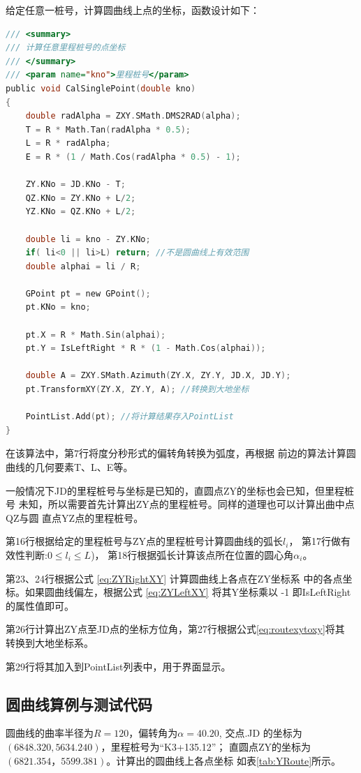 给定任意一桩号，计算圆曲线上点的坐标，函数设计如下：
\begin{lstlisting}[language=C]
/// <summary>
/// 计算任意里程桩号的点坐标
/// </summary>
/// <param name="kno">里程桩号</param>
public void CalSinglePoint(double kno)
{
    double radAlpha = ZXY.SMath.DMS2RAD(alpha);
    T = R * Math.Tan(radAlpha * 0.5);
    L = R * radAlpha;
    E = R * (1 / Math.Cos(radAlpha * 0.5) - 1);

    ZY.KNo = JD.KNo - T;
    QZ.KNo = ZY.KNo + L/2;
    YZ.KNo = QZ.KNo + L/2;

    double li = kno - ZY.KNo;
    if( li<0 || li>L) return; //不是圆曲线上有效范围
    double alphai = li / R;

    GPoint pt = new GPoint();
    pt.KNo = kno;

    pt.X = R * Math.Sin(alphai);
    pt.Y = IsLeftRight * R * (1 - Math.Cos(alphai));

    double A = ZXY.SMath.Azimuth(ZY.X, ZY.Y, JD.X, JD.Y);
    pt.TransformXY(ZY.X, ZY.Y, A); //转换到大地坐标

    PointList.Add(pt); //将计算结果存入PointList
}
\end{lstlisting}

在该算法中，第7行将度分秒形式的偏转角转换为弧度，再根据
前边的算法计算圆曲线的几何要素T、L、E等。

一般情况下JD的里程桩号与坐标是已知的，直圆点ZY的坐标也会已知，但里程桩号
未知，所以需要首先计算出ZY点的里程桩号。同样的道理也可以计算出曲中点QZ与圆
直点YZ点的里程桩号。

第16行根据给定的里程桩号与ZY点的里程桩号计算圆曲线的弧长$l_i$，
第17行做有效性判断:$0 \le l_i \le L$)，
第18行根据弧长计算该点所在位置的圆心角$\alpha_i$。

第23、24行根据公式 \ref{eq:ZYRightXY} 计算圆曲线上各点在ZY坐标系
中的各点坐标。如果圆曲线偏左，根据公式 \ref{eq:ZYLeftXY} 将其Y坐标乘以
 -1 即IsLeftRight的属性值即可。

第26行计算出ZY点至JD点的坐标方位角，第27行根据公式\ref{eq:routexytoxy}将其
转换到大地坐标系。

第29行将其加入到PointList列表中，用于界面显示。

\subsection{圆曲线算例与测试代码}

圆曲线的曲率半径为$R = 120$，偏转角为$\alpha = 40.20$, 交点.JD
的坐标为$(6848.320, 5634.240)$，里程桩号为``K3+135.12''；
直圆点ZY的坐标为$(6821.354，5599.381)$。计算出的圆曲线上各点坐标
如表\ref{tab:YRoute}所示。

